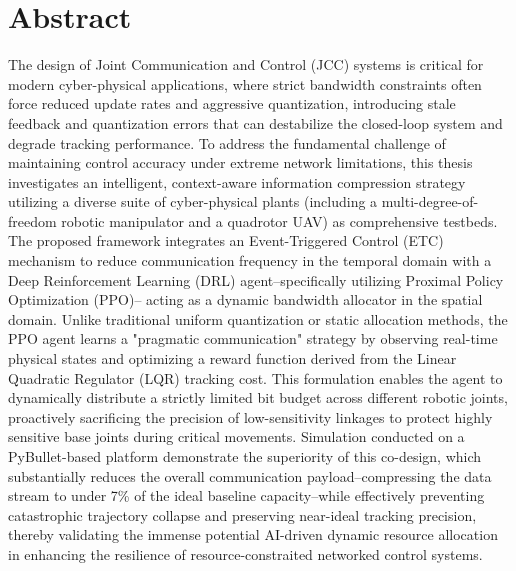 \documentclass[
12pt, %
oneside, %
singlespacing, %
parskip, %
]{article} %
\renewenvironment{abstract}{
	\section*{Abstract}
	\bigskip
	\addcontentsline{toc}{section}{Abstract}}{\clearpage}
\begin{document}
\begin{abstract}
	The design of Joint Communication and Control (JCC) systems is critical for modern cyber-physical applications, where
	strict bandwidth constraints often force reduced update rates and aggressive quantization, introducing stale feedback and quantization errors that can destabilize the closed-loop system and degrade tracking performance. To address the fundamental 
	challenge of maintaining control accuracy under extreme network limitations, this thesis investigates an intelligent,
	context-aware information compression strategy utilizing a diverse suite of cyber-physical plants (including a multi-degree-of-freedom robotic manipulator and a quadrotor UAV) as comprehensive 
	testbeds. The proposed framework integrates an Event-Triggered Control (ETC) mechanism to reduce communication frequency 
	in the temporal domain with a Deep Reinforcement Learning (DRL) agent--specifically utilizing Proximal Policy Optimization (PPO)--
	acting as a dynamic bandwidth allocator in the spatial domain. Unlike traditional uniform quantization or static allocation 
	methods, the PPO agent learns a "pragmatic communication" strategy by observing real-time physical states and optimizing
	a reward function derived from the Linear Quadratic Regulator (LQR) tracking cost. This formulation enables the agent to
	dynamically distribute a strictly limited bit budget across different robotic joints, proactively sacrificing the precision 
	of low-sensitivity linkages to protect highly sensitive base joints during critical movements. Simulation conducted on a 
	PyBullet-based platform demonstrate the superiority of this co-design, which substantially reduces the overall communication
	payload--compressing the data stream to under 7\% of the ideal baseline capacity--while effectively preventing catastrophic trajectory collapse and preserving near-ideal tracking precision, thereby validating the immense potential AI-driven dynamic resource allocation in enhancing the resilience 
	of resource-constraited networked control systems.
\end{abstract}

\end{document}
